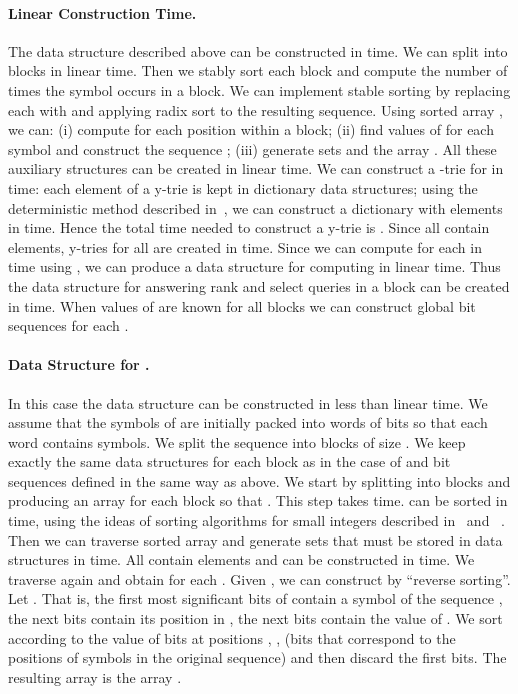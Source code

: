 \documentclass[11pt]{article}\usepackage{fullpage}
\begin{document}
\paragraph{Linear Construction Time.}
The data structure described above can be constructed in  time.  We can split  into blocks in linear time. Then we stably sort each block and compute the number of times  the symbol  occurs in a block. We can implement stable sorting by replacing each  with  and applying radix sort to the resulting sequence. 
Using sorted array , we can: (i) compute  for each position  within a block; (ii) find values of  for each symbol  and construct the sequence ; (iii) generate sets  and the array . All these auxiliary structures can be created in linear time. 
We can construct a -trie for  in  time: 
each element of a y-trie is kept in  dictionary data structures; using the deterministic method described in~\cite{Ruzic08}, we can construct a dictionary with  elements in  time. 
Hence the total time needed to construct a y-trie is . Since all  contain  elements,
y-tries for all  are created in  time.
Since we can compute  for each  in  time using , we can produce a data structure for computing  in linear time. Thus the data structure for answering rank and select queries in a block can 
be created in  time. When values of  are known for all blocks we can  construct global bit sequences  for each  . 

\paragraph{Data Structure  for .}
In this case the data structure can be constructed in less than linear time. We assume that the symbols of  are initially packed into words of  bits so that each word contains  symbols. 
We split the sequence  into blocks of size . We keep exactly the same 
data structures for each block as in the case of   and bit sequences  defined in the same way as above. 
We start by splitting  into blocks and producing an array  for each block  so that 
. This step takes  time. 
 can be sorted in  time, using the ideas of sorting algorithms for small integers described in~\cite{AnderssonHNR95} and~\cite{AlbersH97} . Then we can traverse sorted array  and generate sets that must be stored in data structures  in  time. 
All  contain  elements and can be constructed in  time. 
We traverse  again and obtain  for each . Given , we can construct  by ``reverse sorting''. Let . That is, the first  most significant  bits of  contain a symbol  of the sequence , the next  bits contain its position  in , the next  bits contain the value of . We sort  according to 
the value of bits at positions , ,  (bits that correspond to the positions  of symbols in the original sequence) and then discard the first  bits. 
The resulting array is the array . 
\end{document}
